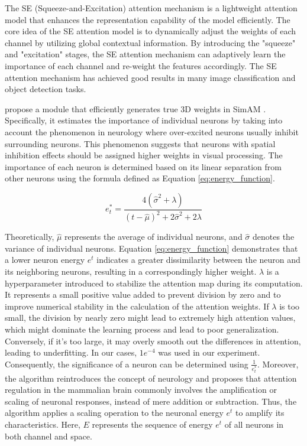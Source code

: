 \documentclass[aic]{iosart2x}
\begin{document}
The SE (Squeeze-and-Excitation) attention mechanism is a lightweight attention model that enhances the representation capability of the model efficiently. The core idea of the SE attention model is to dynamically adjust the weights of each channel by utilizing global contextual information. By introducing the "squeeze" and "excitation" stages, the SE attention mechanism can adaptively learn the importance of each channel and re-weight the features accordingly. The SE attention mechanism has achieved good results in many image classification and object detection tasks.

\citeauthor{Yang2021} propose a module that efficiently generates true 3D weights in SimAM \cite{Yang2021}. Specifically, it estimates the importance of individual neurons by taking into account the phenomenon in neurology where over-excited neurons usually inhibit surrounding neurons. This phenomenon suggests that neurons with spatial inhibition effects should be assigned higher weights in visual processing. The importance of each neuron is determined based on its linear separation from other neurons using the formula defined as Equation \ref{eq:energy_function}.

\begin{equation}
 e_t^* = \frac{4 ( \hat{\sigma} ^ 2 + \lambda )}{(t - \hat{\mu}) ^ 2 + 2 \hat{\sigma} ^ 2 + 2 \lambda}  \label{eq:energy_function}
\end{equation}

Theoretically, $\hat{\mu}$ represents the average of individual neurons, and $\hat{\sigma}$ denotes the variance of individual neurons. Equation \ref{eq:energy_function} demonstrates that a lower neuron energy $e^t$ indicates a greater dissimilarity between the neuron and its neighboring neurons, resulting in a correspondingly higher weight. $\lambda$ is a hyperparameter introduced to stabilize the attention map during its computation. It represents a small positive value added to prevent division by zero and to improve numerical stability in the calculation of the attention weights. If $\lambda$ is too small, the division by nearly zero might lead to extremely high attention values, which might dominate the learning process and lead to poor generalization. Conversely, if it's too large, it may overly smooth out the differences in attention, leading to underfitting. In our cases, $1e^{-4}$ was used in our experiment.  Consequently, the significance of a neuron can be determined using $\frac{1}{e_t^{*}}$. Moreover, the algorithm reintroduces the concept of neurology and proposes that attention regulation in the mammalian brain commonly involves the amplification or scaling of neuronal responses, instead of mere addition or subtraction. Thus, the algorithm applies a scaling operation to the neuronal energy $e^t$ to amplify its characteristics. Here, $E$ represents the sequence of energy $e^t$ of all neurons in both channel and space.
\end{document}

